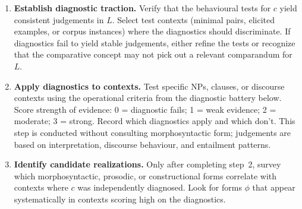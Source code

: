 \documentclass[12pt]{article}
\begin{document}
\begin{enumerate}[label=\arabic*., leftmargin=*]
  \item \textbf{Establish diagnostic traction.} Verify that the behavioural tests for $c$ yield consistent judgements in $L$. Select test contexts (minimal pairs, elicited examples, or corpus instances) where the diagnostics should discriminate. If diagnostics fail to yield stable judgements, either refine the tests or recognize that the comparative concept may not pick out a relevant comparandum for $L$.

  \item \textbf{Apply diagnostics to contexts.} Test specific NPs, clauses, or discourse contexts using the operational criteria from the diagnostic battery below. Score strength of evidence: 0 = diagnostic fails; 1 = weak evidence; 2 = moderate; 3 = strong. Record which diagnostics apply and which don't. This step is conducted without consulting morphosyntactic form; judgements are based on interpretation, discourse behaviour, and entailment patterns.

  \item \textbf{Identify candidate realizations.} Only after completing step~2, survey which morphosyntactic, prosodic, or constructional forms correlate with contexts where $c$ was independently diagnosed. Look for forms $\phi$ that appear systematically in contexts scoring high on the diagnostics.


\end{enumerate}
\end{document}
